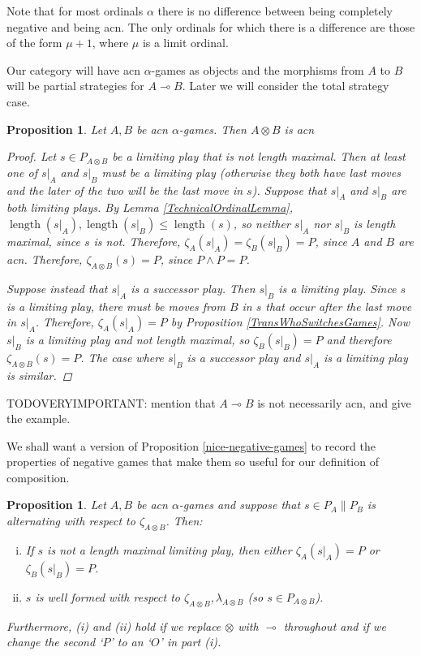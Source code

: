 \documentclass[11pt]{article} %
\theoremstyle{plain} %
\newtheorem{proposition}[theorem]{Proposition}
\theoremstyle{definition} %
\theoremstyle{note}
\theoremstyle{exercisestyle}
\newcommand{\tensor}{\otimes}
\renewcommand{\implies}{\multimap}
\DeclareMathOperator{\length}{length}
\begin{document}
Note that for most ordinals $\alpha$ there is no difference between being completely negative and being acn.  The only ordinals for which there is  a difference are those of the form $\mu+1$, where $\mu$ is a limit ordinal.  

Our category will have acn $\alpha$-games as objects and the morphisms from $A$ to $B$ will be partial strategies for $A\implies B$.  Later we will consider the total strategy case.

\begin{proposition}
  \label{TensorIsAcn}
  Let $A,B$ be acn $\alpha$-games.  Then $A\tensor B$ is acn
  \begin{proof}
    Let $s\in P_{A\tensor B}$ be a limiting play that is not length maximal.  Then at least one of $s\vert_A$ and $s\vert_B$ must be a limiting play (otherwise they both have last moves and the later of the two will be the last move in $s$).  Suppose that $s\vert_A$ and $s\vert_B$ are both limiting plays.  By Lemma \ref{TechnicalOrdinalLemma}, $\length(s\vert_A),\length(s\vert_B)\le\length(s)$, so neither $s\vert_A$ nor $s\vert_B$ is length maximal, since $s$ is not.  Therefore, $\zeta_A(s\vert_A)=\zeta_B(s\vert_B)=P$, since $A$ and $B$ are acn.  Therefore, $\zeta_{A\tensor B}(s)=P$, since $P\wedge P=P$.

    Suppose instead that $s\vert_A$ is a successor play.  Then $s\vert_B$ is a limiting play.  Since $s$ is a limiting play, there must be moves from $B$ in $s$ that occur after the last move in $s\vert_A$.  Therefore, $\zeta_A(s\vert_A)=P$ by Proposition \ref{TransWhoSwitchesGames}.  Now $s\vert_B$ is a limiting play and not length maximal, so $\zeta_B(s\vert_B)=P$ and therefore $\zeta_{A\tensor B}(s)=P$.  The case where $s\vert_B$ is a successor play and $s\vert_A$ is a limiting play is similar.
  \end{proof}
\end{proposition}

TODOVERYIMPORTANT: mention that $A\implies B$ is not necessarily acn, and give the example.

We shall want a version of Proposition \ref{nice-negative-games} to record the properties of negative games that make them so useful for our definition of composition.

\begin{proposition}
  \label{NiceAcnGames}
  Let $A,B$ be acn $\alpha$-games and suppose that $s\in P_A\|P_B$ is alternating with respect to $\zeta_{A\tensor B}$.  Then:
  \begin{enumerate}[i)]
    \item If $s$ is not a length maximal limiting play, then either $\zeta_A(s\vert_A)=P$ or $\zeta_B(s\vert_B)=P$.  
    \item $s$ is well formed with respect to $\zeta_{A\tensor B},\lambda_{A\tensor B}$ (so $s\in P_{A\tensor B}$).
  \end{enumerate}
  Furthermore, (i) and (ii) hold if we replace $\tensor$ with $\implies$ throughout and if we change the second `$P$' to an `$O$' in part (i).
\end{proposition}
\end{document}
